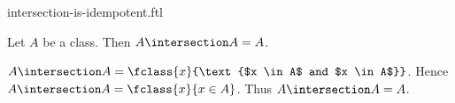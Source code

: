 \documentclass{article}
\begin{document}
\begin{smodule}[creators={Marcel Schütz}]{intersection-is-idempotent.ftl}

  \begin{fproposition*}[label=5333724497444864]
    Let $A$ be a class.
    Then $A \intersection A = A$.
  \end{fproposition*}
  \begin{fproof}
    $A \intersection A = \fclass{x}{\text{$x \in A$ and $x \in A$}}$.
    Hence $A \intersection A = \fclass{x}{x \in A}$.
    Thus $A \intersection A = A$.
  \end{fproof}
\end{smodule}
\end{document}
